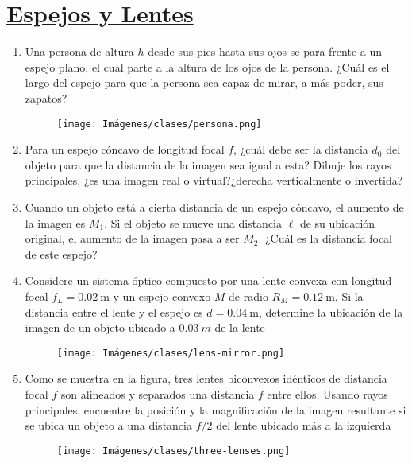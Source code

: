 \documentclass[letterpaper,11pt]{article}
\begin{document}
\section*{\underline{Espejos y Lentes}}
\begin{enumerate}

\item Una persona de altura $h$ desde sus pies hasta sus ojos se para frente a un espejo plano, el cual parte a la altura de los ojos de la persona. ¿Cuál es el largo del espejo para que la persona sea capaz de mirar, a más poder, sus zapatos?

\begin{figure}[H]
    \centering
    \texttt{[image: Imágenes/clases/persona.png]}
\end{figure}

\item Para un espejo cóncavo de longitud focal $f$, ¿cuál debe ser la distancia $d_0$ del objeto para que la distancia de la imagen sea igual a esta? Dibuje los rayos principales, ¿es una imagen real o virtual?¿derecha verticalmente o invertida?

\item Cuando un objeto está a cierta distancia de un espejo cóncavo, el aumento de la imagen es $M_1$. Si el objeto se mueve una distancia $\ell$ de su ubicación original, el aumento de la imagen pasa a ser $M_2$. ¿Cuál es la distancia focal de este espejo?

\item Considere un sistema óptico compuesto por una lente convexa con longitud focal $f_L = \SI{0.02}{\m}$ y un espejo convexo $M$ de radio $R_M = \SI{0.12}{\m}$. Si la distancia entre el lente y el espejo es $d=\SI{0.04}{\m}$, determine la ubicación de la imagen de un objeto ubicado a $\SI{0.03}{m}$ de la lente

\begin{figure}[H]
    \centering
    \texttt{[image: Imágenes/clases/lens-mirror.png]}
\end{figure}

\item Como se muestra en la figura, tres lentes biconvexos idénticos de distancia focal $f$ son alineados y separados una distancia $f$ entre ellos. Usando rayos principales, encuentre la posición y la magnificación de la imagen resultante si se ubica un objeto a una distancia $f/2$ del lente ubicado más a la izquierda

\begin{figure}[H]
    \centering
    \texttt{[image: Imágenes/clases/three-lenses.png]}
\end{figure}


\end{enumerate}
\end{document}
